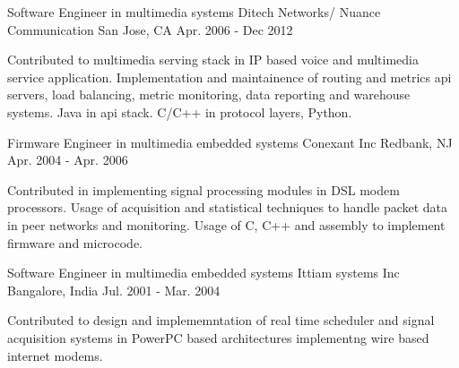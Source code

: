 \begin{cventries}
  \cventry
    {Software Engineer in multimedia systems} %
    {Ditech Networks/ Nuance Communication} %
    {San Jose, CA} %
    {Apr. 2006 - Dec 2012} %
    {
      \begin{cvitems} %
       \item{Contributed to multimedia serving stack in IP based voice and multimedia service application. Implementation and maintainence of routing and metrics api servers, load balancing, metric monitoring, data reporting and warehouse systems.
       Java in api stack. C/C++ in protocol layers, Python.}
      \end{cvitems}
    }

  \cventry
    {Firmware Engineer in multimedia embedded  systems } %
    {Conexant Inc} %
    {Redbank, NJ} %
    {Apr. 2004 - Apr. 2006} %
    {
      \begin{cvitems} %
       \item {Contributed in implementing signal processing modules in DSL modem processors. Usage of acquisition and statistical techniques to handle packet data in peer networks and monitoring. Usage of C, C++ and assembly to implement firmware and microcode. }
      \end{cvitems}
    }


  \cventry
    {Software Engineer in multimedia embedded  systems } %
    {Ittiam systems Inc} %
    {Bangalore, India} %
    {Jul. 2001 - Mar. 2004} %
    {
      \begin{cvitems} %
       \item {Contributed to design and implememntation of real time scheduler and  signal acquisition systems in PowerPC based architectures  implementng wire based internet modems.}
      \end{cvitems}
    }

\end{cventries}
